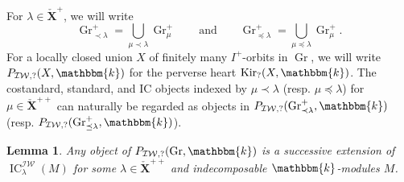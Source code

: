 \documentclass{amsart}
\renewcommand{\k}{\mathbbm{k}}
\newcommand{\bfXv}{\check{\mathbf{X}}}
\newcommand{\IW}{\mathcal{IW}}
\DeclareMathOperator{\IC}{IC}
\DeclareMathOperator{\Gr}{Gr}
\DeclareMathOperator{\Kir}{Kir}
\newtheorem{lemma}[subsubsection]{Lemma}
\theoremstyle{definition}
\begin{document}
    For $\lambda \in \bfXv^+$, we will write
    \[\Gr_{\prec \lambda}^+ = \bigcup_{\mu \prec \lambda} \Gr_{\mu}^+ \qquad\text{and}\qquad \Gr_{\preceq \lambda}^+ = \bigcup_{\mu \preceq \lambda} \Gr_{\mu}^+.\]
    For a locally closed union $X$ of finitely many $I^+$-orbits in $\Gr$, we will write $P_{\IW, ?} (X, \k)$ for the perverse heart $\Kir_? (X, \k)$.
    The costandard, standard, and IC objects indexed by $\mu \prec \lambda$ (resp. $\mu \preceq \lambda$) for $\mu \in \bfXv^{++}$ can naturally be regarded as objects in $P_{\IW, ?} (\Gr_{\prec \lambda}^+, \k)$ (resp. $P_{\IW, ?} (\Gr_{\preceq \lambda}^+, \k)$).

    \begin{lemma}\label{lem:gens_for_perv}
        Any object of $P_{\IW, ?} (\Gr, \k)$ is a successive extension of $\IC_{\lambda}^{\IW} (M)$ for some $\lambda \in \bfXv^{++}$ and indecomposable $\k$-modules $M$.
    \end{lemma}
\end{document}
